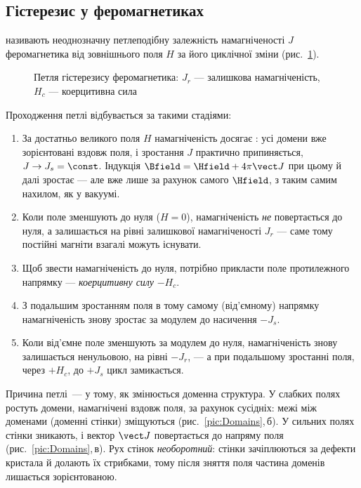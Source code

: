 
\subsection*{Гістерезис у феромагнетиках}

 називають неоднозначну петлеподібну залежність намагніченості $J$ феромагнетика від зовнішнього поля $H$ за його циклічної
зміни (рис.~\ref{pic:Hysteresis}).

\begin{figure}\centering
	\caption{Петля гістерезису феромагнетика: $J_r$ --- залишкова намагніченість, $H_c$ ---
		коерцитивна сила\label{pic:Hysteresis}}
\end{figure}

Проходження петлі відбувається за такими стадіями:
\begin{enumerate}
	\item За достатньо великого поля $H$ намагніченість досягає : усі домени вже зорієнтовані вздовж поля, і зростання $J$
	      практично припиняється, $J\to J_s=\const$. Індукція $\Bfield = \Hfield+4\pi\vect J$ при цьому й далі зростає --- але вже лише за
	      рахунок самого $\Hfield$, з таким самим нахилом, як у вакуумі.
	\item Коли поле зменшують до нуля ($H=0$), намагніченість \emph{не} повертається до нуля, а залишається на рівні залишкової намагніченості
	      $J_r$ --- саме тому постійні магніти взагалі можуть існувати.
	\item Щоб звести намагніченість до нуля, потрібно прикласти поле протилежного напрямку --- \emph{коерцитивну силу} $-H_c$.
	\item З подальшим зростанням поля в тому самому (від'ємному) напрямку намагніченість знову зростає за модулем до насичення $-J_s$.
	\item Коли від'ємне поле зменшують за модулем до нуля, намагніченість знову залишається ненульовою, на рівні $-J_r$, --- а при подальшому зростанні поля, через $+H_c$, до $+J_s$ цикл замикається.
\end{enumerate}

Причина петлі~--- у тому, як змінюється доменна структура. У слабких полях ростуть домени, намагнічені вздовж поля, за рахунок сусідніх: межі між доменами (доменні стінки) зміщуються (рис.~\ref{pic:Domains},\,б). У сильних полях стінки зникають, і вектор $\vect J$ повертається до напряму поля (рис.~\ref{pic:Domains},\,в). Рух стінок \emph{необоротний}: стінки зачіплюються за дефекти кристала й долають їх стрибками, тому після зняття поля частина доменів лишається зорієнтованою.

